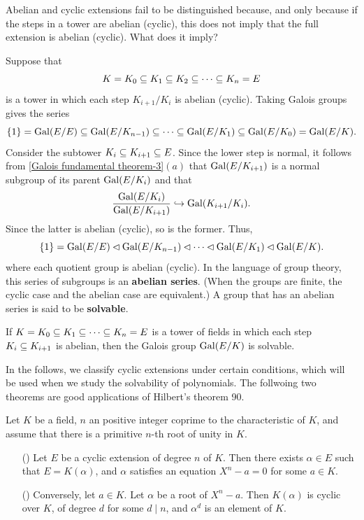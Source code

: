Abelian and cyclic extensions fail to be distinguished because, and only because if the steps in a tower are abelian (cyclic), this does not imply that the full extension is abelian (cyclic). What does it imply?\par
Suppose that
\[K=K_0\subseteq K_1\subseteq K_2\subseteq\cdots\subseteq K_{n}=E\]
is a tower in which each step $K_{i+1}/K_i$ is abelian (cyclic). Taking Galois groups gives the series
\[\{1\}=\mathrm{Gal}(E/E)\subseteq\mathrm{Gal}(E/K_{n-1})\subseteq\cdots\subseteq\mathrm{Gal}(E/K_1)\subseteq \mathrm{Gal}(E/K_0)=\mathrm{Gal}(E/K).\]
Consider the subtower $K_i\subseteq K_{i+1}\subseteq E$. Since the lower step is normal, it follows from \cref{Galois fundamental theorem-3}$(a)$ that $\mathrm{Gal}(E/K_{i+1})$ is a normal subgroup of its parent $\mathrm{Gal}(E/K_i)$ and that
\[\frac{\mathrm{Gal}(E/K_i)}{\mathrm{Gal}(E/K_{i+1})}\hookrightarrow\mathrm{Gal}(K_{i+1}/K_{i}).\]
Since the latter is abelian (cyclic), so is the former. Thus,
\[\{1\}=\mathrm{Gal}(E/E)\lhd\mathrm{Gal}(E/K_{n-1})\lhd\cdots\lhd\mathrm{Gal}(E/K_1)\lhd\mathrm{Gal}(E/K).\]
where each quotient group is abelian (cyclic). In the language of group theory, this series of subgroups is an \textbf{abelian series}. (When the groups are finite, the cyclic case and the abelian case are equivalent.) A group that has an abelian series is said to be \textbf{solvable}.
\begin{proposition}\label{Galois group of successive abelian extension is slovable}
If $K=K_0\subseteq K_1\subseteq\cdots\subseteq K_n=E$ is a tower of fields in which each step $K_{i}\subseteq K_{i+1}$ is abelian, then the Galois group $\mathrm{Gal}(E/K)$ is solvable.
\end{proposition}
In the follows, we classify cyclic extensions under certain conditions, which will be used when we study the solvability of polynomials. The follwoing two theorems are good applications of Hilbert's theorem 90.
\begin{theorem}\label{field ext cyclic nonchar case}
Let $K$ be a field, $n$ an positive integer coprime to the characteristic of $K$, and assume that there is a primitive $n$-th root of unity in $K$.
\begin{itemize}
\item[(\rmnum{1})] Let $E$ be a cyclic extension of degree $n$ of $K$. Then there exists $\alpha\in E$ such that $E=K(\alpha)$, and $\alpha$ satisfies an equation $X^n-a=0$ for some $a\in K$.
\item[(\rmnum{2})] Conversely, let $a\in K$. Let $\alpha$ be a root of $X^n-a$. Then $K(\alpha)$ is cyclic over $K$, of degree $d$ for some $d\mid n$, and $\alpha^d$ is an element of $K$.
\end{itemize}
\end{theorem}
